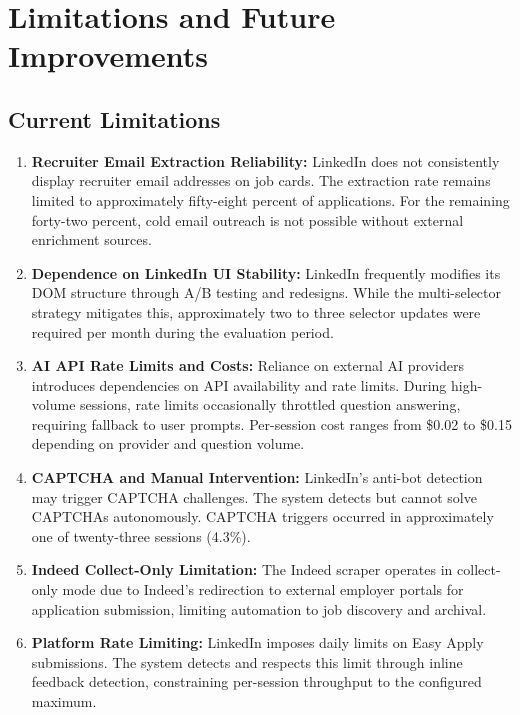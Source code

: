 \documentclass[12pt, a4paper, oneside]{report}
\begin{document}
\section{Limitations and Future Improvements}
\label{sec:limitations-future}

\subsection{Current Limitations}

\begin{enumerate}
    \item \textbf{Recruiter Email Extraction Reliability:} LinkedIn does not consistently display recruiter email addresses on job cards. The extraction rate remains limited to approximately fifty-eight percent of applications. For the remaining forty-two percent, cold email outreach is not possible without external enrichment sources.

    \item \textbf{Dependence on LinkedIn UI Stability:} LinkedIn frequently modifies its DOM structure through A/B testing and redesigns. While the multi-selector strategy mitigates this, approximately two to three selector updates were required per month during the evaluation period.

    \item \textbf{AI API Rate Limits and Costs:} Reliance on external AI providers introduces dependencies on API availability and rate limits. During high-volume sessions, rate limits occasionally throttled question answering, requiring fallback to user prompts. Per-session cost ranges from \$0.02 to \$0.15 depending on provider and question volume.

    \item \textbf{CAPTCHA and Manual Intervention:} LinkedIn's anti-bot detection may trigger CAPTCHA challenges. The system detects but cannot solve CAPTCHAs autonomously. CAPTCHA triggers occurred in approximately one of twenty-three sessions (4.3\%).

    \item \textbf{Indeed Collect-Only Limitation:} The Indeed scraper operates in collect-only mode due to Indeed's redirection to external employer portals for application submission, limiting automation to job discovery and archival.

    \item \textbf{Platform Rate Limiting:} LinkedIn imposes daily limits on Easy Apply submissions. The system detects and respects this limit through inline feedback detection, constraining per-session throughput to the configured maximum.
\end{enumerate}
\end{document}

